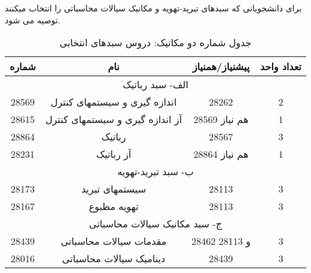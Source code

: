 \documentclass[class=article, crop=false]{standalone}
\begin{document}
\text{\#}
برای دانشجویانی که سبدهای تبرید-تهویه و مکانیک سیالات محاسباتی را انتخاب میکنند توصیه می شود.
\begin{table}[H]
	\begin{center}
\begin{tabular}{|c|c|c|c|}
	\hline
	شماره & نام & پیشنیاز/همنیاز & 	تعداد واحد \\
	\hline
	\multicolumn{4}{|c|}{الف- سبد رباتیک} \\
	\hline
	28569 & اندازه گیری و سیستمهای کنترل & 28262  & 	2 \\
	\hline
	28615 & آز اندازه گیری و سیستمهای کنترل & 28569 هم نیاز & 	1 \\
	\hline
	28864 & رباتیک & 28567 & 	3 \\
	\hline
	28231 & آز رباتیک & 28864 هم نیاز & 	1 \\
	\hline
	\multicolumn{4}{|c|}{ب- سبد تبرید-تهویه} \\
	\hline
	28173 & سیستمهای تبرید & 28113 & 	3 \\
	\hline
	28167 & تهویه مطبوع & 28113 & 	3 \\
	\hline
	\multicolumn{4}{|c|}{ج- سبد مکانیک سیالات محاسباتی} \\
	\hline
	28439 & مقدمات سیالات محاسباتی & 28462 و 28113 & 	3 \\
	\hline
	28016 & دینامیک سیالات محاسباتی & 28439 & 	3 \\
	\hline
\end{tabular}
\caption{\label{mech-t2}
جدول شماره دو مکانیک: دروس سبدهای انتخابی
}
\end{center}
\end{table}
\end{document}
